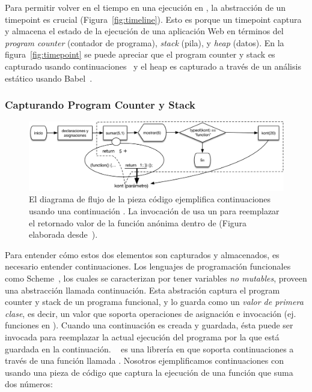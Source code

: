 \documentclass[conference]{IEEEtran}
\begin{document}
Para permitir volver en el tiempo en una ejecuci\'on en \deloreanjs, la abstracci\'on de un timepoint es crucial (Figura~\ref{fig:timeline}). Esto es porque un timepoint captura y almacena el estado de la ejecuci\'on de una aplicaci\'on Web en t\'erminos del {\em program counter} (contador de programa), {\em stack} (pila), y {\em heap} (datos). En la figura~\ref{fig:timepoint} se puede apreciar que el program counter y stack es capturado usando continuaciones~\cite{fw84} y el heap es capturado a trav\'es de un an\'alisis est\'atico usando Babel~\cite{mckenzie:babel}.        
  
 \smallskip

\subsubsection{Capturando Program Counter y Stack}
\label{sec:continuaciones}

\begin{figure}[t]
\begin{center}
\includegraphics[width=.8\linewidth]{fig-kont}
\caption{El diagrama de flujo de la pieza c\'odigo ejemplifica continuaciones usando una continuaci\'on . La invocaci\'on de  usa un  para reemplazar el retornado valor de la funci\'on an\'onima dentro de  (Figura elaborada desde~\cite{legerFukuda:sac-se2017}).}  

\label{fig:kont}
\end{center}
\end{figure}


Para entender c\'omo estos dos elementos son capturados y almacenados, es necesario entender continuaciones. Los lenguajes de programaci\'on funcionales como Scheme~\cite{scheme48}, los cuales se caracterizan por tener variables {\em no mutables}, proveen una abstracci\'on llamada continuaci\'on. Esta abstraci\'on captura el program counter y stack de un programa funcional, y lo guarda como un {\em valor de primera clase}, es decir, un valor que soporta operaciones de asignaci\'on e invocaci\'on (ej. funciones en \javascript). Cuando una continuaci\'on es creada y guardada, \'esta puede ser invocada para reemplazar la actual ejecuci\'on del programa por la que est\'a guardada en la continuaci\'on. \unwinder~\cite{unwinder:2018} es una librer\'ia en \javascript que soporta continuaciones a trav\'es de una funci\'on llamada . Nosotros ejemplificamos continuaciones con \unwinder usando una pieza de c\'odigo que captura la ejecuci\'on de una funci\'on que suma dos n\'umeros:     
\end{document}

